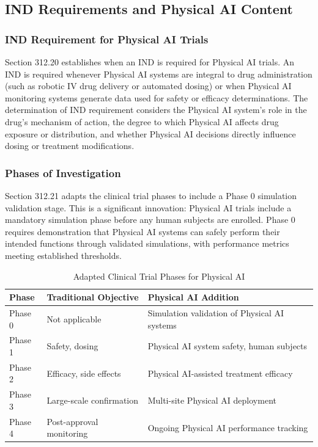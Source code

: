 \subsection{IND Requirements and Physical AI Content}
\label{subsec:cfr312-ind}

\subsubsection{IND Requirement for Physical AI Trials}

Section 312.20 establishes when an IND is required for Physical AI trials. An
IND is required whenever Physical AI systems are integral to drug
administration (such as robotic IV drug delivery or automated dosing) or when
Physical AI monitoring systems generate data used for safety or efficacy
determinations. The determination of IND requirement considers the Physical AI
system's role in the drug's mechanism of action, the degree to which Physical
AI affects drug exposure or distribution, and whether Physical AI decisions
directly influence dosing or treatment modifications.

\clearpage

\subsubsection{Phases of Investigation}

Section 312.21 adapts the clinical trial phases to include a Phase 0 simulation
validation stage. This is a significant innovation: Physical AI trials include
a mandatory simulation phase before any human subjects are enrolled. Phase 0
requires demonstration that Physical AI systems can safely perform their
intended functions through validated simulations, with performance metrics
meeting established thresholds.

\begin{table}[H]
\centering
\caption{Adapted Clinical Trial Phases for Physical AI}
\label{tab:trial-phases}
\small
\begin{tabularx}{\textwidth}{l X X}
\toprule
\textbf{Phase} & \textbf{Traditional Objective} & \textbf{Physical AI Addition} \\
\midrule
Phase 0 & Not applicable & Simulation validation of Physical AI systems \\
Phase 1 & Safety, dosing & Physical AI system safety, human subjects \\
Phase 2 & Efficacy, side effects & Physical AI-assisted treatment efficacy \\
Phase 3 & Large-scale confirmation & Multi-site Physical AI deployment \\
Phase 4 & Post-approval monitoring & Ongoing Physical AI performance tracking \\
\bottomrule
\end{tabularx}
\end{table}

